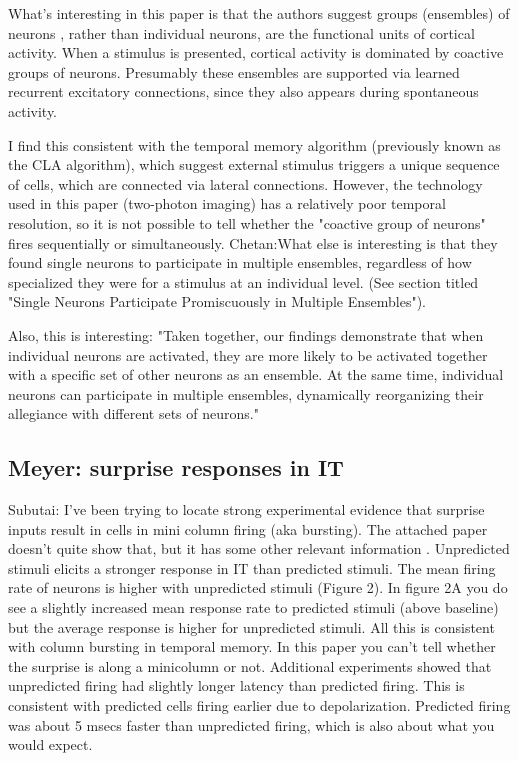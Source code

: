 \documentclass{article} %
\begin{document}
What's interesting in this paper is that the authors suggest groups (ensembles)
of neurons , rather than individual neurons, are the functional units of
cortical activity. When a stimulus is presented, cortical activity is dominated
by coactive groups of neurons.  Presumably these ensembles are supported via
learned recurrent excitatory connections, since they also appears during
spontaneous activity.

I find this consistent with the temporal memory algorithm (previously known as
the CLA algorithm), which suggest external stimulus triggers a unique sequence
of cells, which are connected via lateral connections. However, the technology
used in this paper (two-photon imaging) has a relatively poor temporal
resolution, so it is not possible to tell whether the "coactive group of
neurons" fires sequentially or simultaneously.
Chetan:What else is interesting is that they found single neurons to participate
in multiple ensembles, regardless of how specialized they were for a stimulus at
an individual level. (See section titled "Single Neurons Participate
Promiscuously in Multiple Ensembles").

Also, this is interesting: "Taken together, our findings demonstrate that when
individual neurons are activated, they are more likely to be activated together
with a specific set of other neurons as an ensemble. At the same time,
individual neurons can participate in multiple ensembles, dynamically
reorganizing their allegiance with different sets of neurons."

\subsection{Meyer: surprise responses in IT}

Subutai: I've been trying to locate strong experimental evidence that surprise
inputs result in cells in mini column firing (aka bursting).  The attached paper
doesn't quite show that, but it has some other relevant information
\cite{Meyer2011}.  Unpredicted stimuli elicits a stronger response in IT than
predicted stimuli. The mean firing rate of neurons is higher with unpredicted
stimuli (Figure 2). In figure 2A you do see a slightly increased mean response
rate to predicted stimuli (above baseline) but the average response is higher
for unpredicted stimuli. All this is consistent with column bursting in temporal
memory. In this paper you can't tell whether the surprise is along a minicolumn
or not. Additional experiments showed that unpredicted firing had slightly
longer latency than predicted firing. This is consistent with predicted cells
firing earlier due to depolarization. Predicted firing was about 5 msecs faster
than unpredicted firing, which is also about what you would expect.
\end{document}
